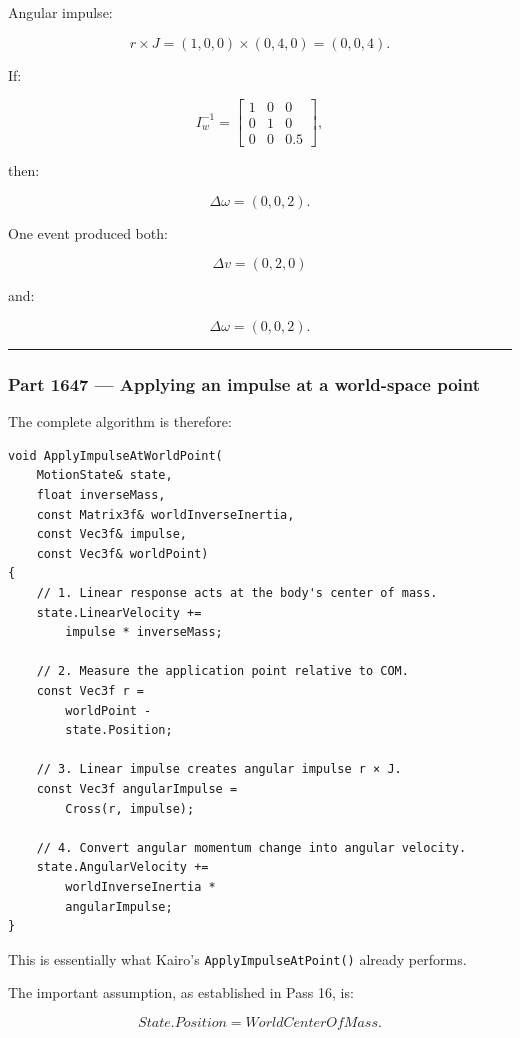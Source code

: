 Angular impulse:

\[
r\times J
=
(1,0,0)\times(0,4,0)
=
(0,0,4).
\]

If:

\[
I_w^{-1}
=
\begin{bmatrix}
1&0&0\\
0&1&0\\
0&0&0.5
\end{bmatrix},
\]

then:

\[
\Delta\omega
=
(0,0,2).
\]

One event produced both:

\[
\Delta v=(0,2,0)
\]

and:

\[
\Delta\omega=(0,0,2).
\]

\begin{center}\rule{0.5\linewidth}{0.5pt}\end{center}

\subsubsection{Part 1647 --- Applying an impulse at a world-space point}\label{part-1647-applying-an-impulse-at-a-world-space-point}

The complete algorithm is therefore:

\begin{verbatim}
void ApplyImpulseAtWorldPoint(
    MotionState& state,
    float inverseMass,
    const Matrix3f& worldInverseInertia,
    const Vec3f& impulse,
    const Vec3f& worldPoint)
{
    // 1. Linear response acts at the body's center of mass.
    state.LinearVelocity +=
        impulse * inverseMass;

    // 2. Measure the application point relative to COM.
    const Vec3f r =
        worldPoint -
        state.Position;

    // 3. Linear impulse creates angular impulse r × J.
    const Vec3f angularImpulse =
        Cross(r, impulse);

    // 4. Convert angular momentum change into angular velocity.
    state.AngularVelocity +=
        worldInverseInertia *
        angularImpulse;
}
\end{verbatim}

This is essentially what Kairo's \texttt{ApplyImpulseAtPoint()} already performs.

The important assumption, as established in Pass 16, is:

\[
\boxed{
State.Position
=
WorldCenterOfMass.
}
\]

